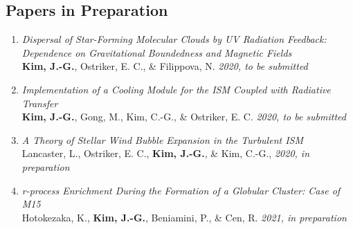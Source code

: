 \subsection{Papers in Preparation}
\begin{enumerate}
\item[] \textit{Dispersal of Star-Forming Molecular Clouds by UV Radiation
    Feedback: Dependence on Gravitational Boundedness and Magnetic Fields} \\
  \textbf{Kim, J.-G.}, Ostriker, E. C., \& Filippova, N. \textit{2020, to be
    submitted}
\item[] \textit{Implementation of a Cooling Module for the ISM Coupled with Radiative
    Transfer}\\ \textbf{Kim, J.-G.}, Gong, M., Kim, C.-G., \& Ostriker, E. C.
  \textit{2020, to be submitted}
\item[] \textit{A Theory of Stellar Wind Bubble Expansion in the Turbulent
    ISM}\\
  Lancaster, L., Ostriker, E. C., \textbf{Kim, J.-G.}, \& Kim, C.-G.,
  \textit{2020, in preparation}
\item[] \textit{r-process Enrichment During the Formation of a Globular Cluster: Case
    of M15} \\
  Hotokezaka, K., \textbf{Kim, J.-G.}, Beniamini, P., \& Cen, R. \textit{2021,
    in preparation}

\end{enumerate}

